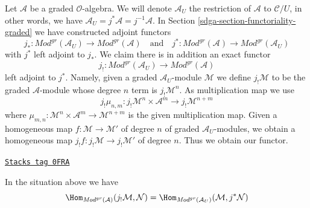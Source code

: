 \medskip\noindent
Let $\mathcal{A}$ be a graded $\mathcal{O}$-algebra.
We will denote $\mathcal{A}_U$ the restriction of $\mathcal{A}$
to $\mathcal{C}/U$, in other words, we have
$\mathcal{A}_U = j^*\mathcal{A} = j^{-1}\mathcal{A}$.
In Section \ref{sdga-section-functoriality-graded}
we have constructed adjoint functors
$$
j_* :
\textit{Mod}^{gr}(\mathcal{A}_U)
\longrightarrow
\textit{Mod}^{gr}(\mathcal{A})
\quad\text{and}\quad
j^* :
\textit{Mod}^{gr}(\mathcal{A})
\longrightarrow
\textit{Mod}^{gr}(\mathcal{A}_U)
$$
with $j^*$ left adjoint to $j_*$. We claim there is in addition an
exact functor
$$
j_! :
\textit{Mod}^{gr}(\mathcal{A}_U)
\longrightarrow
\textit{Mod}^{gr}(\mathcal{A})
$$
left adjoint to $j^*$. Namely, given a graded $\mathcal{A}_U$-module
$\mathcal{M}$ we define $j_!\mathcal{M}$ to be the graded $\mathcal{A}$-module
whose degree $n$ term is $j_!\mathcal{M}^n$. As multiplication map
we use
$$
j_!\mu_{n, m} :
j_!\mathcal{M}^n \times \mathcal{A}^m \to
j_!\mathcal{M}^{n + m}
$$
where $\mu_{m, n} : \mathcal{M}^n \times \mathcal{A}^m \to \mathcal{M}^{n + m}$
is the given multiplication map. Given a homogeneous map
$f : \mathcal{M} \to \mathcal{M}'$ of degree $n$ of graded
$\mathcal{A}_U$-modules, we obtain a homogeneous map
$j_!f : j_!\mathcal{M} \to j_!\mathcal{M}'$ of degree $n$.
Thus we obtain our functor.

\begin{lemma}
\label{sdga-lemma-extension-by-zero-graded}
\href{https://stacks.math.columbia.edu/tag/0FRA}{\texttt{Stacks tag 0FRA}}

In the situation above we have
$$
\Hom_{\textit{Mod}^{gr}(\mathcal{A})}(
j_!\mathcal{M}, \mathcal{N}) =
\Hom_{\textit{Mod}^{gr}(\mathcal{A}_U)}(
\mathcal{M}, j^*\mathcal{N})
$$
\end{lemma}

